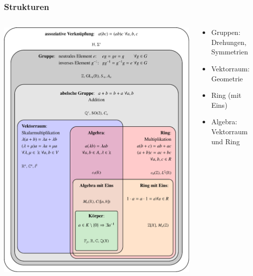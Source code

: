 %
%
%
\begin{frame}[t]
\frametitle{Strukturen}
\vspace{-15pt}
\begin{columns}[t,onlytextwidth]
\begin{column}{0.42\textwidth}
\begin{center}
\includegraphics[width=\textwidth]{../../buch/chapters/10-vektorenmatrizen/images/strukturen.pdf}
\end{center}
\end{column}
\begin{column}{0.54\textwidth}
\begin{itemize}[<+->]
\item Gruppen: Drehungen, Symmetrien
\item Vektorraum: Geometrie
\item Ring (mit Eins)
\item Algebra: Vektorraum und Ring

\end{itemize}
\end{column}
\end{columns}
\end{frame}
